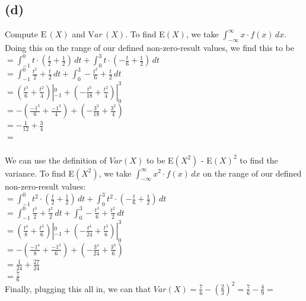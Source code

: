 \documentclass{article}
\begin{document}
{\subsection*{(d)}
Compute $\mathrm E\,\left(X\right)$ and $\mathrm Var\, (X)$.
To find E$(X)$, we take $\int_{-\infty}^{\infty}x \cdot f(x) \,dx$. Doing this on the range of our defined non-zero-result values, we find this to be \\ 
$ = \int_{-1}^{0} t \cdot (\frac{t}{2} + \frac{1}{2}) \,dt + \int_{0}^{3} t \cdot (-\frac{t}{6} + \frac{1}{2}) \,dt$ \\ 
$ = \int_{-1}^{0} \frac{t^2}{2} + \frac{t}{2} \,dt + \int_{0}^{3} -\frac{t^2}{6} + \frac{t}{2} \,dt$ \\ 
$ = (\frac{t^3}{6} + \frac{t^2}{4})|_{-1}^{0} + (-\frac{t^3}{18} + \frac{t^2}{4})|_{0}^{3}$ \\ 
$ = -(\frac{-1^3}{6} + \frac{-1^2}{4}) + (-\frac{3^3}{18} + \frac{3^2}{4})$ \\ 
$ = -\frac{1}{12} + \frac{3}{4}$ \\ 
$ = $  \\ \\ 
We can use the definition of $Var(X)$ to be E$(X^2)$ - E$(X)^2$ to find the variance. To find E$(X^2)$, we take $\int_{-\infty}^{\infty}x^2 \cdot f(x) \,dx$ on the range of our defined non-zero-result values: \\ 
$ = \int_{-1}^{0} t^2 \cdot (\frac{t}{2} + \frac{1}{2}) \,dt + \int_{0}^{3} t^2 \cdot (-\frac{t}{6} + \frac{1}{2}) \,dt$ \\ 
$ = \int_{-1}^{0} \frac{t^3}{2} + \frac{t^2}{2} \,dt + \int_{0}^{3} -\frac{t^3}{6} + \frac{t^2}{2} \,dt$ \\ 
$ = (\frac{t^4}{8} + \frac{t^3}{6})|_{-1}^{0} + (-\frac{t^4}{24} + \frac{t^3}{6})|_{0}^{3}$ \\ 
$ = -(\frac{-1^4}{8} + \frac{-1^3}{6}) + (-\frac{3^4}{24} + \frac{3^3}{6})$ \\ 
$ = \frac{1}{24} + \frac{27}{24}$ \\ 
$ = \frac{7}{6}$ \\ 
Finally, plugging this all in, we can that $Var(X) = \frac{7}{6} - (\frac{2}{3})^2 = \frac{7}{6} - \frac{4}{9} = $ 

}
\end{document}
